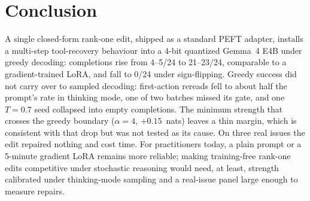 \documentclass[11pt]{article}
\begin{document}
\section{Conclusion}
A single closed-form rank-one edit, shipped as a standard PEFT adapter, installs a multi-step tool-recovery behaviour into a 4-bit quantized Gemma~4 E4B under greedy decoding: completions rise from 4--5/24 to 21--23/24, comparable to a gradient-trained LoRA, and fall to 0/24 under sign-flipping. Greedy success did not carry over to sampled decoding: first-action rereads fell to about half the prompt's rate in thinking mode, one of two batches missed its gate, and one $T=0.7$ seed collapsed into empty completions. The minimum strength that crosses the greedy boundary ($\alpha=4$, $+0.15$~nats) leaves a thin margin, which is consistent with that drop but was not tested as its cause. On three real issues the edit repaired nothing and cost time. For practitioners today, a plain prompt or a 5-minute gradient LoRA remains more reliable; making training-free rank-one edits competitive under stochastic reasoning would need, at least, strength calibrated under thinking-mode sampling and a real-issue panel large enough to measure repairs.



\end{document}
